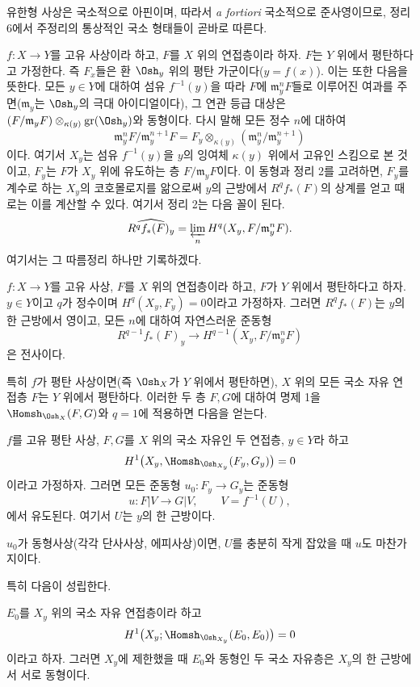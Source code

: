 유한형 사상은 국소적으로 아핀이며, 따라서 \textit{a fortiori}
국소적으로 준사영이므로, 정리 6에서 주정리의 통상적인 국소 형태들이
곧바로 따른다.

$f:X\longrightarrow Y$를 고유 사상이라 하고, $F$를 $X$ 위의 연접층이라
하자. $F$는 $Y$ 위에서 평탄하다고 가정한다. 즉 $F_x$들은 환
$\Osh_y$ 위의 평탄 가군이다($y=f(x)$). 이는 또한 다음을 뜻한다. 모든
$y\in Y$에 대하여 섬유 $f^{-1}(y)$을 따라 $F$에
$\mathfrak m_y^nF$들로 이루어진 여과를 주면($\mathfrak m_y$는
$\Osh_y$의 극대 아이디얼이다), 그 연관 등급 대상은
$(F/\mathfrak m_yF)\otimes_{\kappa(y)}\operatorname{gr}(\Osh_y)$와
동형이다. 다시 말해 모든 정수 $n$에 대하여
\[
  \mathfrak m_y^nF/\mathfrak m_y^{n+1}F
  =F_y\otimes_{\kappa(y)}
  (\mathfrak m_y^n/\mathfrak m_y^{n+1})
\]
이다. 여기서 $X_y$는 섬유 $f^{-1}(y)$을 $y$의 잉여체 $\kappa(y)$
위에서 고유인 스킴으로 본 것이고, $F_y$는 $F$가 $X_y$ 위에 유도하는
층 $F/\mathfrak m_yF$이다. 이 동형과 정리 2를 고려하면, $F_y$를
계수로 하는 $X_y$의 코호몰로지를 앎으로써 $y$의 근방에서
$R^qf_*(F)$의 상계를 얻고 때로는 이를 계산할 수 있다. 여기서 정리 2는
다음 꼴이 된다.
\[
  \widehat{R^qf_*(F)_y}
  =\varprojlim_n H^q(X_y,F/\mathfrak m_y^nF).
\]
여기서는 그 따름정리 하나만 기록하겠다.

 $f:X\longrightarrow Y$를 고유 사상, $F$를 $X$ 위의
연접층이라 하고, $F$가 $Y$ 위에서 평탄하다고 하자. $y\in Y$이고 $q$가
정수이며 $H^q(X_y,F_y)=0$이라고 가정하자. 그러면 $R^qf_*(F)$는 $y$의
한 근방에서 영이고, 모든 $n$에 대하여 자연스러운 준동형
\[
  R^{q-1}f_*(F)_y\longrightarrow
  H^{q-1}(X_y,F/\mathfrak m_y^nF)
\]
은 전사이다.

특히 $f$가 평탄 사상이면(즉 $\Osh_X$가 $Y$ 위에서 평탄하면), $X$ 위의
모든 국소 자유 연접층 $F$는 $Y$ 위에서 평탄하다. 이러한 두 층 $F,G$에
대하여 명제 1을 $\Homsh_{\Osh_X}(F,G)$와 $q=1$에 적용하면 다음을 얻는다.

 $f$를 고유 평탄 사상, $F,G$를 $X$ 위의 국소 자유인 두
연접층, $y\in Y$라 하고
\[
  H^1\bigl(X_y,\Homsh_{\Osh_{X_y}}(F_y,G_y)\bigr)=0
\]
이라고 가정하자. 그러면 모든 준동형 $u_0:F_y\longrightarrow G_y$는
준동형
\[
  u:F|V\longrightarrow G|V,
  \qquad V=f^{-1}(U),
\]
에서 유도된다. 여기서 $U$는 $y$의 한 근방이다.

 $u_0$가 동형사상(각각 단사사상, 에피사상)이면,
$U$를 충분히 작게 잡았을 때 $u$도 마찬가지이다.

특히 다음이 성립한다.

 $E_0$를 $X_y$ 위의 국소 자유 연접층이라 하고
\[
  H^1\bigl(X_y;\Homsh_{\Osh_{X_y}}(E_0,E_0)\bigr)=0
\]
이라고 하자. 그러면 $X_y$에 제한했을 때 $E_0$와 동형인 두 국소
자유층은 $X_y$의 한 근방에서 서로 동형이다.

